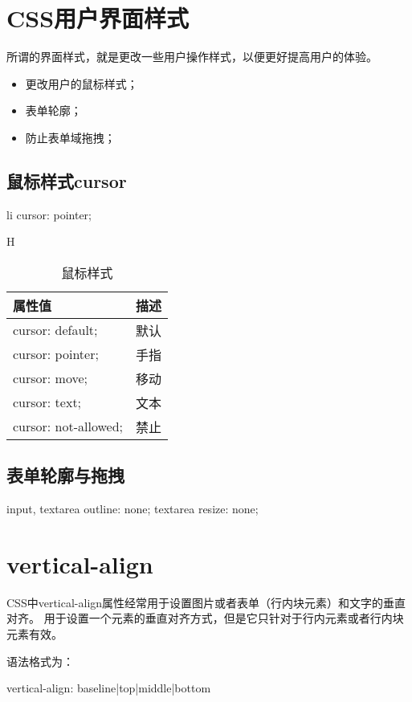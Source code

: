 \section{CSS用户界面样式}
所谓的界面样式，就是更改一些用户操作样式，以便更好提高用户的体验。

\begin{itemize}
    \item 更改用户的鼠标样式；
    \item 表单轮廓；
    \item 防止表单域拖拽；
\end{itemize}
\subsection{鼠标样式cursor}
\begin{css}
    li {
    cursor: pointer;
    }
\end{css}
\begin{table}[H]H
    \caption{鼠标样式}
    \centering\begin{tabular}{ll}
        \hline
        属性值                  & 描述 \\
        \hline
        cursor: default;     & 默认 \\
        cursor: pointer;     & 手指 \\
        cursor: move;        & 移动 \\
        cursor: text;        & 文本 \\
        cursor: not-allowed; & 禁止 \\
        \hline
    \end{tabular}

\end{table}
\subsection{表单轮廓与拖拽}
\begin{css}
    input,
    textarea {
            outline: none;
        }
    textarea {
            resize: none;
        }
\end{css}
\section{vertical-align}
CSS中vertical-align属性经常用于设置图片或者表单（行内块元素）和文字的垂直对齐。 用于设置一个元素的垂直对齐方式，但是它只针对于行内元素或者行内块元素有效。

语法格式为：
\begin{css}
    vertical-align: baseline|top|middle|bottom
\end{css}

